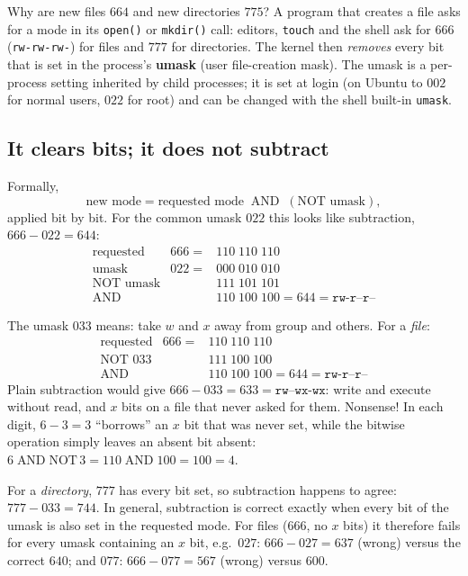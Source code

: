 \documentclass[11pt,a4paper]{article}
\newcommand{\term}[1]{\textbf{\color{mintdeep}#1}}
\newcommand{\cmd}[1]{\texttt{#1}}
\begin{document}
Why are new files $664$ and new directories $775$? A program that creates a file asks for a mode in its \cmd{open()} or \cmd{mkdir()} call: editors, \cmd{touch} and the shell ask for $666$ (\texttt{rw-rw-rw-}) for files and $777$ for directories. The kernel then \emph{removes} every bit that is set in the process's \term{umask} (user file-creation mask). The umask is a per-process setting inherited by child processes; it is set at login (on Ubuntu to $002$ for normal users, $022$ for root) and can be changed with the shell built-in \cmd{umask}.

\subsection{It clears bits; it does not subtract}

Formally,
\[
\text{new mode} = \text{requested mode} \;\mathbin{\text{AND}}\; (\text{NOT umask}),
\]
applied bit by bit. For the common umask $022$ this looks like subtraction, $666 - 022 = 644$:
\[
\begin{array}{lrl}
\text{requested} & 666 = & 110\;110\;110 \\
\text{umask}     & 022 = & 000\;010\;010 \\
\text{NOT umask} &       & 111\;101\;101 \\ \hline
\text{AND}       &       & 110\;100\;100 = 644 = \texttt{rw-r--r--}
\end{array}
\]

\begin{example}
The umask $033$ means: take $w$ and $x$ away from group and others. For a \emph{file}:
\[
\begin{array}{lrl}
\text{requested} & 666 = & 110\;110\;110 \\
\text{NOT } 033  &       & 111\;100\;100 \\ \hline
\text{AND}       &       & 110\;100\;100 = 644 = \texttt{rw-r--r--}
\end{array}
\]
Plain subtraction would give $666 - 033 = 633 = \texttt{rw--wx-wx}$: write and execute without read, and $x$ bits on a file that never asked for them. Nonsense! In each digit, $6 - 3 = 3$ ``borrows'' an $x$ bit that was never set, while the bitwise operation simply leaves an absent bit absent: $6 \mathbin{\text{AND}} \text{NOT}\,3 = 110 \mathbin{\text{AND}} 100 = 100 = 4$.

For a \emph{directory}, $777$ has every bit set, so subtraction happens to agree: $777 - 033 = 744$. In general, subtraction is correct exactly when every bit of the umask is also set in the requested mode. For files ($666$, no $x$ bits) it therefore fails for every umask containing an $x$ bit, e.g.\ $027$: $666 - 027 = 637$ (wrong) versus the correct $640$; and $077$: $666 - 077 = 567$ (wrong) versus $600$.
\end{example}
\end{document}
